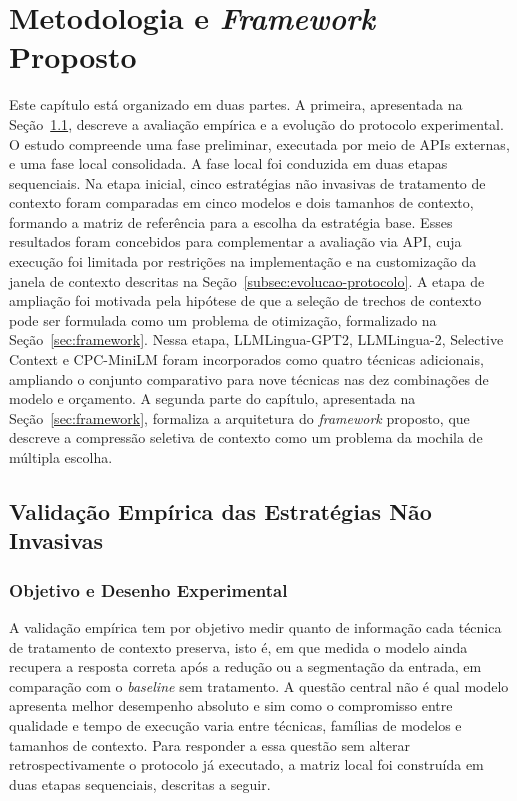 \chapter{Metodologia e \textit{Framework} Proposto}
\label{cap:metodologia}

Este capítulo está organizado em duas partes. A primeira, apresentada na Seção~\ref{sec:validacao-empirica}, descreve a avaliação empírica e a evolução do protocolo experimental. O estudo compreende uma fase preliminar, executada por meio de APIs externas, e uma fase local consolidada. A fase local foi conduzida em duas etapas sequenciais. Na etapa inicial, cinco estratégias não invasivas de tratamento de contexto foram comparadas em cinco modelos e dois tamanhos de contexto, formando a matriz de referência para a escolha da estratégia base. Esses resultados foram concebidos para complementar a avaliação via API, cuja execução foi limitada por restrições na implementação e na customização da janela de contexto descritas na Seção~\ref{subsec:evolucao-protocolo}. A etapa de ampliação foi motivada pela hipótese de que a seleção de trechos de contexto pode ser formulada como um problema de otimização, formalizado na Seção~\ref{sec:framework}. Nessa etapa, LLMLingua-GPT2, LLMLingua-2, Selective Context e CPC-MiniLM foram incorporados como quatro técnicas adicionais, ampliando o conjunto comparativo para nove técnicas nas dez combinações de modelo e orçamento. A segunda parte do capítulo, apresentada na Seção~\ref{sec:framework}, formaliza a arquitetura do \textit{framework} proposto, que descreve a compressão seletiva de contexto como um problema da mochila de múltipla escolha.

\section{Validação Empírica das Estratégias Não Invasivas}
\label{sec:validacao-empirica}

\subsection{Objetivo e Desenho Experimental}
\label{subsec:desenho}

A validação empírica tem por objetivo medir quanto de informação cada técnica de tratamento de contexto preserva, isto é, em que medida o modelo ainda recupera a resposta correta após a redução ou a segmentação da entrada, em comparação com o \textit{baseline} sem tratamento. A questão central não é qual modelo apresenta melhor desempenho absoluto e sim como o compromisso entre qualidade e tempo de execução varia entre técnicas, famílias de modelos e tamanhos de contexto. Para responder a essa questão sem alterar retrospectivamente o protocolo já executado, a matriz local foi construída em duas etapas sequenciais, descritas a seguir.

